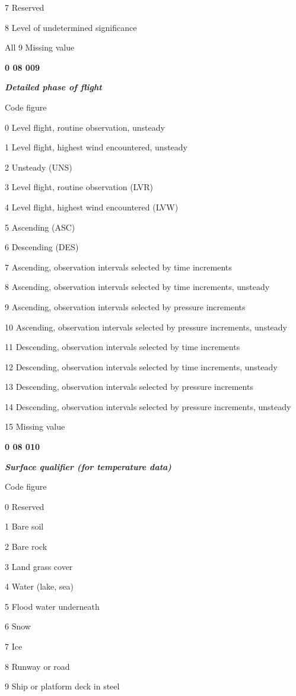 7 Reserved

8 Level of undetermined significance

All 9 Missing value

\textbf{0 08 009}

\emph{\textbf{Detailed phase of flight}}

Code figure

0 Level flight, routine observation, unsteady

1 Level flight, highest wind encountered, unsteady

2 Unsteady (UNS)

3 Level flight, routine observation (LVR)

4 Level flight, highest wind encountered (LVW)

5 Ascending (ASC)

6 Descending (DES)

7 Ascending, observation intervals selected by time increments

8 Ascending, observation intervals selected by time increments, unsteady

9 Ascending, observation intervals selected by pressure increments

10 Ascending, observation intervals selected by pressure increments, unsteady

11 Descending, observation intervals selected by time increments

12 Descending, observation intervals selected by time increments, unsteady

13 Descending, observation intervals selected by pressure increments

14 Descending, observation intervals selected by pressure increments, unsteady

15 Missing value

\textbf{0 08 010}

\emph{\textbf{Surface qualifier (for temperature data)}}

Code figure

0 Reserved

1 Bare soil

2 Bare rock

3 Land grass cover

4 Water (lake, sea)

5 Flood water underneath

6 Snow

7 Ice

8 Runway or road

9 Ship or platform deck in steel

